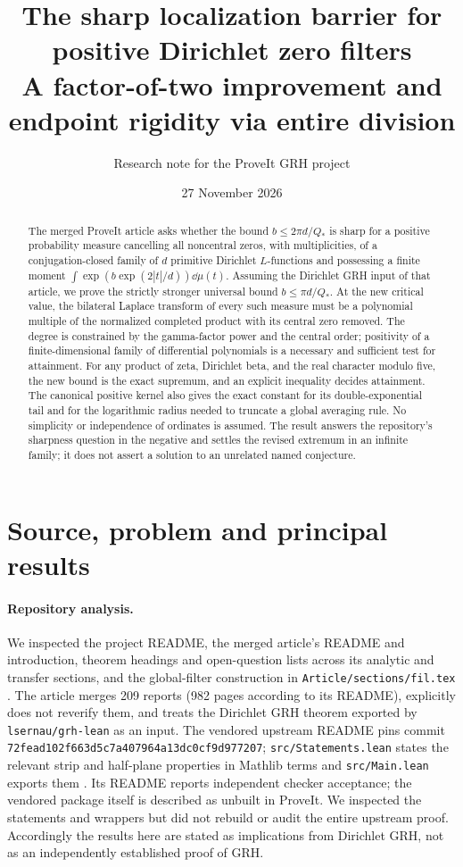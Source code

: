 \documentclass[11pt]{article}
\title{\textbf{The sharp localization barrier for positive Dirichlet zero filters}\\[5pt]\large A factor-of-two improvement and endpoint rigidity via entire division}
\author{Research note for the ProveIt GRH project}
\date{27 November 2026}
\theoremstyle{definition}\newtheorem{definition}[theorem]{Definition}
\theoremstyle{remark}\newtheorem{remark}[theorem]{Remark}
\begin{document}
\maketitle
\begin{abstract}
The merged ProveIt article asks whether the bound $b\le 2\pi d/Q_*$ is sharp for a positive probability measure cancelling all noncentral zeros, with multiplicities, of a conjugation-closed family of $d$ primitive Dirichlet $L$-functions and possessing a finite moment $\int\exp(b\exp(2|t|/d))\dd\mu(t)$. Assuming the Dirichlet GRH input of that article, we prove the strictly stronger universal bound $b\le \pi d/Q_*$. At the new critical value, the bilateral Laplace transform of every such measure must be a polynomial multiple of the normalized completed product with its central zero removed. The degree is constrained by the gamma-factor power and the central order; positivity of a finite-dimensional family of differential polynomials is a necessary and sufficient test for attainment. For any product of zeta, Dirichlet beta, and the real character modulo five, the new bound is the exact supremum, and an explicit inequality decides attainment. The canonical positive kernel also gives the exact constant for its double-exponential tail and for the logarithmic radius needed to truncate a global averaging rule. No simplicity or independence of ordinates is assumed. The result answers the repository's sharpness question in the negative and settles the revised extremum in an infinite family; it does not assert a solution to an unrelated named conjecture.
\end{abstract}
\tableofcontents

\section{Source, problem and principal results}
\paragraph{Repository analysis.} We inspected the project README, the merged article's README and introduction, theorem headings and open-question lists across its analytic and transfer sections, and the global-filter construction in \texttt{Article/sections/fil.tex} \cite{proveit,fil}. The article merges 209 reports (982 pages according to its README), explicitly does not reverify them, and treats the Dirichlet GRH theorem exported by \texttt{lsernau/grh-lean} as an input. The vendored upstream README pins commit \texttt{72fead102f663d5c7a407964a13dc0cf9d977207}; \texttt{src/Statements.lean} states the relevant strip and half-plane properties in Mathlib terms and \texttt{src/Main.lean} exports them \cite{lean}. Its README reports independent checker acceptance; the vendored package itself is described as unbuilt in ProveIt. We inspected the statements and wrappers but did not rebuild or audit the entire upstream proof. Accordingly the results here are stated as implications from Dirichlet GRH, not as an independently established proof of GRH.
\end{document}
